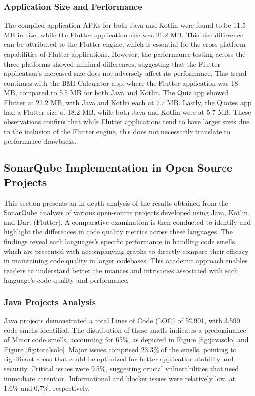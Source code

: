 \subsubsection{Application Size and Performance}
The compiled application APKs for both Java and Kotlin were found to be 11.5 MB in size, while the Flutter application size was 21.2 MB. This size difference can be attributed to the Flutter engine, which is essential for the cross-platform capabilities of Flutter applications. However, the performance testing across the three platforms showed minimal differences, suggesting that the Flutter application’s increased size does not adversely affect its performance. This trend continues with the BMI Calculator app, where the Flutter application was 18 MB, compared to 5.5 MB for both Java and Kotlin. The Quiz app showed Flutter at 21.2 MB, with Java and Kotlin each at 7.7 MB. Lastly, the Quotes app had a Flutter size of 18.2 MB, while both Java and Kotlin were at 5.7 MB. These observations confirm that while Flutter applications tend to have larger sizes due to the inclusion of the Flutter engine, this does not necessarily translate to performance drawbacks.\subsection{SonarQube Implementation in Open Source Projects}
This section presents an in-depth analysis of the results obtained from the SonarQube analysis of various open-source projects developed using Java, Kotlin, and Dart (Flutter). A comparative examination is then conducted to identify and highlight the differences in code quality metrics across these languages. The findings reveal each languages's specific performance in handling code smells, which are presented with accompanying graphs to directly compare their efficacy in maintaining code quality in larger codebases. This academic approach enables readers to understand better the nuances and intricacies associated with each language's code quality and performance.
\subsubsection{Java Projects Analysis}
Java projects demonstrated a total Lines of Code (LOC) of 52,901, with 3,590 code smells identified. The distribution of these smells indicates a predominance of Minor code smells, accounting for 65\%, as depicted in Figure \ref{fig:javasolo} and Figure \ref{fig:totalsolo}. Major issues comprised 23.3\% of the smells, pointing to significant areas that could be optimized for better application stability and security. Critical issues were 9.5\%, suggesting crucial vulnerabilities that need immediate attention. Informational and blocker issues were relatively low, at 1.6\% and 0.7\%, respectively.

